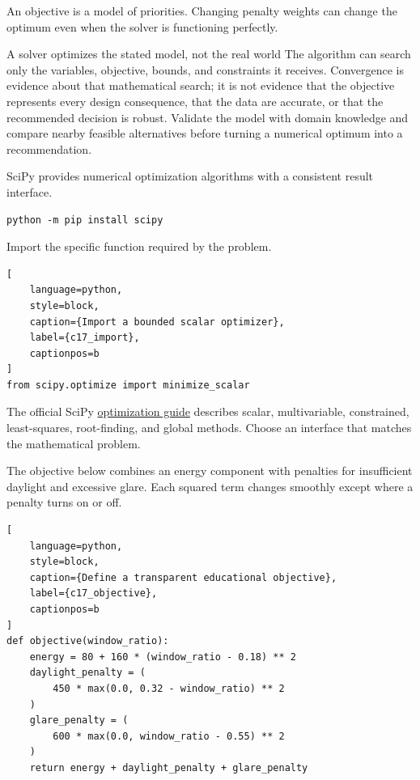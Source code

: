 An objective is a model of priorities. Changing penalty weights can change the
optimum even when the solver is functioning perfectly.

\begin{ExplainBox}{A solver optimizes the stated model, not the real world}
The algorithm can search only the variables, objective, bounds, and constraints
it receives. Convergence is evidence about that mathematical search; it is not
evidence that the objective represents every design consequence, that the data
are accurate, or that the recommended decision is robust. Validate the model
with domain knowledge and compare nearby feasible alternatives before turning
a numerical optimum into a recommendation.
\end{ExplainBox}


SciPy provides numerical optimization algorithms with a consistent result
interface.

\begin{verbatim}
python -m pip install scipy
\end{verbatim}

Import the specific function required by the problem.

\begin{lstlisting}[
    language=python,
    style=block,
    caption={Import a bounded scalar optimizer},
    label={c17_import},
    captionpos=b
]
from scipy.optimize import minimize_scalar
\end{lstlisting}

The official SciPy
\href{https://docs.scipy.org/doc/scipy/tutorial/optimize.html}{optimization guide}
describes scalar, multivariable, constrained, least-squares, root-finding, and
global methods. Choose an interface that matches the mathematical problem.


The objective below combines an energy component with penalties for insufficient
daylight and excessive glare. Each squared term changes smoothly except where a
penalty turns on or off.

\begin{lstlisting}[
    language=python,
    style=block,
    caption={Define a transparent educational objective},
    label={c17_objective},
    captionpos=b
]
def objective(window_ratio):
    energy = 80 + 160 * (window_ratio - 0.18) ** 2
    daylight_penalty = (
        450 * max(0.0, 0.32 - window_ratio) ** 2
    )
    glare_penalty = (
        600 * max(0.0, window_ratio - 0.55) ** 2
    )
    return energy + daylight_penalty + glare_penalty
\end{lstlisting}

